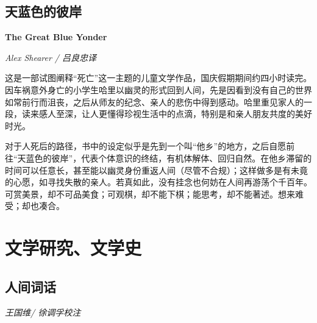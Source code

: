 \subsection*{天蓝色的彼岸}
\par \textbf{The Great Blue Yonder}
\par \emph{Alex Shearer / 吕良忠译} 

\par 这是一部试图阐释“死亡”这一主题的儿童文学作品，国庆假期期间约四小时读完。因车祸意外身亡的小学生哈里以幽灵的形式回到人间，先是因看到没有自己的世界如常前行而沮丧，之后从师友的纪念、亲人的悲伤中得到感动。哈里重见家人的一段，读来感人至深，让人更懂得珍视生活中的点滴，特别是和亲人朋友共度的美好时光。
\par 对于人死后的路径，书中的设定似乎是先到一个叫“他乡”的地方，之后自愿前往“天蓝色的彼岸”，代表个体意识的终结，有机体解体、回归自然。在他乡滞留的时间可以任意长，甚至能以幽灵身份重返人间（尽管不合规）；这样做多是有未竟的心愿，如寻找失散的亲人。若真如此，没有挂念也何妨在人间再游荡个千百年。可赏美景，却不可品美食；可观棋，却不能下棋；能思考，却不能著述。想来难受；却也凑合。
\par {}


\section{文学研究、文学史}

\subsection*{人间词话}
\par \emph{王国维/ 徐调孚校注} 

